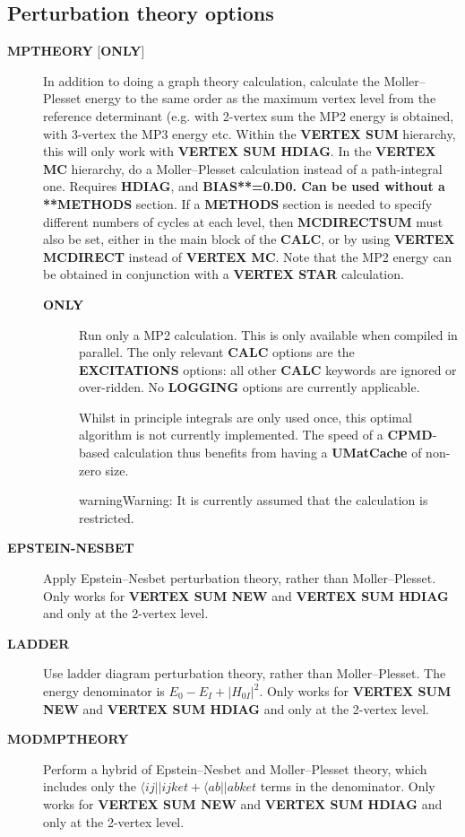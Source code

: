 \documentclass[openany,a4paper,10pt,english]{manual}
\newcommand{\bra}{\ensuremath{\langle}}
\begin{document}
\subsection{Perturbation theory options}
\begin{description}
\item[\textbf{MPTHEORY} {[}\textbf{ONLY}{]}] \leavevmode
In addition to doing a graph theory calculation, calculate the Moller--Plesset
energy to the same order as the maximum vertex level from the
reference determinant (e.g. with 2-vertex sum the MP2 energy is
obtained, with 3-vertex the MP3 energy etc.  Within the \textbf{VERTEX SUM}
hierarchy, this will only work with \textbf{VERTEX SUM HDIAG}.
In the \textbf{VERTEX MC} hierarchy, do a Moller--Plesset calculation
instead of a path-integral one.  Requires \textbf{HDIAG}, and \textbf{BIAS**=0.D0.
Can be used without a **METHODS} section.  If a \textbf{METHODS} section is
needed to specify different numbers of cycles at each level, then
\textbf{MCDIRECTSUM} must also be set, either in the main block of the \textbf{CALC},
or by using \textbf{VERTEX MCDIRECT} instead of \textbf{VERTEX MC}.
Note that the MP2 energy
can be obtained in conjunction with a \textbf{VERTEX STAR} calculation.
\begin{description}
\item[\textbf{ONLY}] \leavevmode
Run only a MP2 calculation.  This is only available when
compiled in parallel.  The only relevant \textbf{CALC} options are the
\textbf{EXCITATIONS} options: all other \textbf{CALC} keywords are ignored
or over-ridden.  No \textbf{LOGGING} options are currently applicable.

Whilst in principle integrals are only used once, this optimal
algorithm is not currently implemented.  The speed of a \textbf{CPMD}-based
calculation thus benefits from having a \textbf{UMatCache} of non-zero size.

\begin{notice}{warning}{Warning:}
It is currently assumed that the calculation is restricted.
\end{notice}

\end{description}

\item[\textbf{EPSTEIN-NESBET}] \leavevmode
Apply Epstein--Nesbet perturbation theory, rather than
Moller--Plesset.  Only works for \textbf{VERTEX SUM NEW} and \textbf{VERTEX
SUM HDIAG} and only at the 2-vertex level.

\item[\textbf{LADDER}] \leavevmode
Use ladder diagram perturbation theory, rather than Moller--Plesset.
The energy denominator is $E_0-E_I+|H_{0I}|^2$.  Only works
for \textbf{VERTEX SUM NEW} and \textbf{VERTEX SUM HDIAG} and only at the
2-vertex level.

\item[\textbf{MODMPTHEORY}] \leavevmode
Perform a hybrid of Epstein--Nesbet and Moller--Plesset theory,
which includes only the $\bra ij||ij ket +\bra ab||ab ket$
terms in the denominator.  Only works for \textbf{VERTEX SUM NEW} and
\textbf{VERTEX SUM HDIAG} and only at the 2-vertex level.

\end{description}
\end{document}
